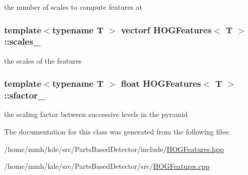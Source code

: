 the number of scales to compute features at 

\hypertarget{classHOGFeatures_a27490a8c33c7ffbfdeedafc5af0ad544}{
\subsubsection[{scales\-\_\-}]{\setlength{\rightskip}{0pt plus 5cm}template$<$typename T $>$ {\bf vectorf} {\bf H\-O\-G\-Features}$<$ T $>$\-::scales\-\_\-\hspace{0.3cm}{\ttfamily [private]}}}\label{classHOGFeatures_a27490a8c33c7ffbfdeedafc5af0ad544}


the scales of the features 

\hypertarget{classHOGFeatures_a45b232ca94e93b4f30d342374e62578f}{
\subsubsection[{sfactor\-\_\-}]{\setlength{\rightskip}{0pt plus 5cm}template$<$typename T $>$ float {\bf H\-O\-G\-Features}$<$ T $>$\-::sfactor\-\_\-\hspace{0.3cm}{\ttfamily [private]}}}\label{classHOGFeatures_a45b232ca94e93b4f30d342374e62578f}


the scaling factor between successive levels in the pyramid 



The documentation for this class was generated from the following files\-:\begin{DoxyCompactItemize}
\item 
/home/mmh/kde/src/\-Parts\-Based\-Detector/include/\hyperlink{HOGFeatures_8hpp}{H\-O\-G\-Features.\-hpp}\item 
/home/mmh/kde/src/\-Parts\-Based\-Detector/src/\hyperlink{HOGFeatures_8cpp}{H\-O\-G\-Features.\-cpp}\end{DoxyCompactItemize}
